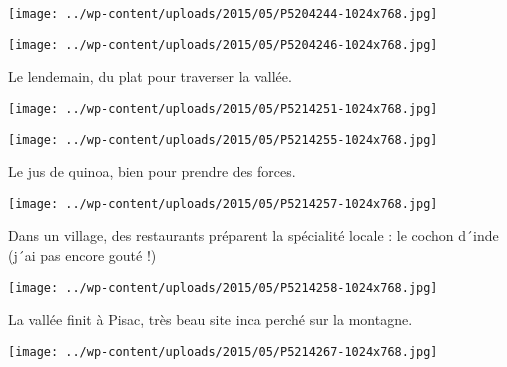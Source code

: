  

\begin{center} \texttt{[image: ../wp-content/uploads/2015/05/P5204244-1024x768.jpg]} \end{center}

 

 

\begin{center} \texttt{[image: ../wp-content/uploads/2015/05/P5204246-1024x768.jpg]} \end{center}

 

 Le lendemain, du plat pour traverser la vallée. 

 

\begin{center} \texttt{[image: ../wp-content/uploads/2015/05/P5214251-1024x768.jpg]} \end{center}

 

 

\begin{center} \texttt{[image: ../wp-content/uploads/2015/05/P5214255-1024x768.jpg]} \end{center}

 

 Le jus de quinoa, bien pour prendre des forces. 

 

\begin{center} \texttt{[image: ../wp-content/uploads/2015/05/P5214257-1024x768.jpg]} \end{center}

 

 Dans un village, des restaurants préparent la spécialité locale : le cochon d´inde (j´ai pas encore gouté !) 

 

\begin{center} \texttt{[image: ../wp-content/uploads/2015/05/P5214258-1024x768.jpg]} \end{center}

 

 La vallée finit à Pisac, très beau site inca perché sur la montagne. 

 

\begin{center} \texttt{[image: ../wp-content/uploads/2015/05/P5214267-1024x768.jpg]} \end{center}

